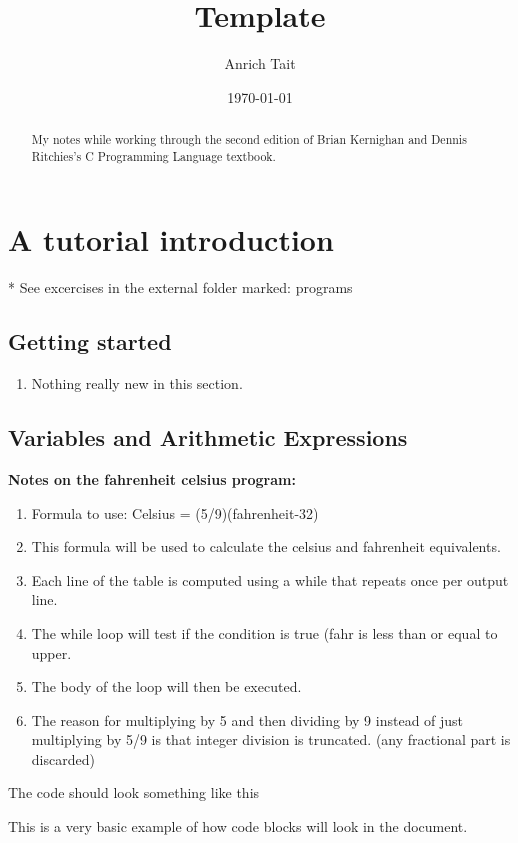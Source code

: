 \documentclass[12pt, letterpaper]{report}
\title{Template}
\author{Anrich Tait}
\date{\today}
\begin{document}
\restoregeometry %
\nopagecolor%

\begin{abstract}
	My notes while working through the second edition of Brian Kernighan and Dennis
	Ritchies's C Programming Language textbook.
\end{abstract}
\tableofcontents

\chapter{A tutorial introduction}
* See excercises in the external folder marked: programs

\section{Getting started}
\begin{enumerate}
	\item Nothing really new in this section.
\end{enumerate}

\section{Variables and Arithmetic Expressions}
\textbf{Notes on the fahrenheit celsius program:}
\begin{enumerate}
	\item Formula to use: Celsius = (5/9)(fahrenheit-32)
	\item This formula will be used to calculate the celsius and fahrenheit equivalents.
	\item Each line of the table is computed using a while that repeats once per output line.
	\item The while loop will test if the condition is true (fahr is less than or equal to upper.
	\item The body of the loop will then be executed.
	\item The reason for multiplying by 5 and then dividing by 9 instead of just multiplying by 5/9 is that integer division is truncated.
		(any fractional part is discarded)
\end{enumerate}
The code should look something like this

	This is a very basic example of how code blocks will look in the document.
\end{document}
